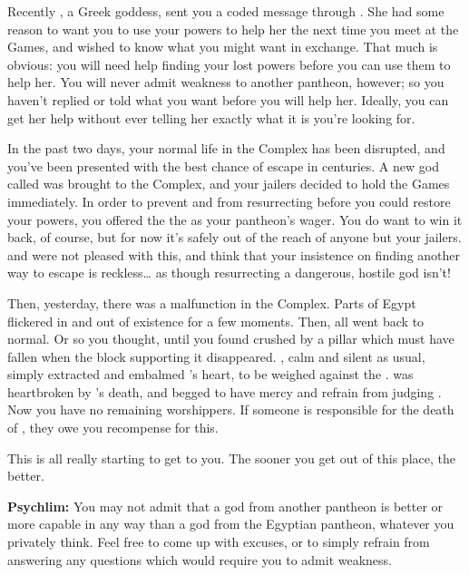 \documentclass[char]{guardians}
\begin{document}
Recently \cHera{}, a Greek goddess, sent you a coded message through \cJascha{}. She had some reason to want you to use your powers to help her the next time you meet at the Games, and wished to know what you might want in exchange. That much is obvious: you will need help finding your lost powers before you can use them to help her. You will never admit weakness to another pantheon, however; so you haven't replied or told \cHera{} what you want before you will help her. Ideally, you can get her help without ever telling her exactly what it is you're looking for.

In the past two days, your normal life in the Complex has been disrupted, and you've been presented with the best chance of escape in centuries. A new god called \cUnity{} was brought to the Complex, and your jailers decided to hold the Games immediately. In order to prevent \cIsis{} and \cAnubis{} from resurrecting \cSet{} before you could restore your powers, you offered the \cCaretaker{} the \iNecro{\MYname} as your pantheon's wager. You do want to win it back, of course, but for now it's safely out of the reach of anyone but your jailers. \cIsis{} and \cAnubis{} were not pleased with this, and think that your insistence on finding another way to escape is reckless\ldots{} as though resurrecting a dangerous, hostile god isn't!

Then, yesterday, there was a malfunction in the Complex. Parts of Egypt flickered in and out of existence for a few moments. Then, all went back to normal. Or so you thought, until you found \cEgyptianHuman{} crushed by a pillar which must have fallen when the block supporting it disappeared. \cAnubis{}, calm and silent as usual, simply extracted and embalmed \cEgyptianHuman{}'s heart, to be weighed against the \iFeather{\MYname}. \cIsis{} was heartbroken by \cEgyptianHuman{}'s death, and begged \cAnubis{} to have mercy and refrain from judging \cEgyptianHuman{\them}. Now you have no remaining worshippers. If someone is responsible for the death of \cEgyptianHuman{}, they owe you recompense for this.

This is all really starting to get to you. The sooner you get out of this place, the better.

\begin{itemz}[Notes]
  \item\textbf{Psychlim:} You may not admit that a god from another pantheon is better or more capable in any way than a god from the Egyptian pantheon, whatever you privately think. Feel free to come up with excuses, or to simply refrain from answering any questions which would require you to admit weakness.
\end{itemz}
\end{document}

